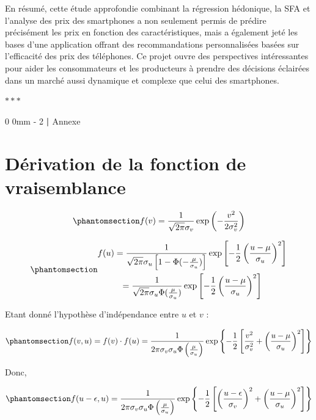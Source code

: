 \documentclass[
  12pt,
]{report}
\makeatletter
\newcommand{\macrostars}{
    \vspace{2em}
    \begin{center}
        \textcolor{highlight!80!black}{\Large{$\ast\ast\ast$}}
    \end{center}
}
\renewcommand{\chapter}{%
    \clearpage %
    \@startsection{chapter}%
    {0} %
    {0mm} %
    {-\baselineskip} %
    {2\baselineskip} %
    {\normalfont\Huge\bfseries | \Huge\bfseries}%
}
\makeatother
\begin{document}
En résumé, cette étude approfondie combinant la régression hédonique, la
SFA et l'analyse des prix des smartphones a non seulement permis de
prédire précisément les prix en fonction des caractéristiques, mais a
également jeté les bases d'une application offrant des recommandations
personnalisées basées sur l'efficacité des prix des téléphones. Ce
projet ouvre des perspectives intéressantes pour aider les consommateurs
et les producteurs à prendre des décisions éclairées dans un marché
aussi dynamique et complexe que celui des smartphones.

\macrostars

\chapter{Annexe}\label{annexe}

\section{Dérivation de la fonction de
vraisemblance}\label{duxe9rivation-de-la-fonction-de-vraisemblance}

\begin{equation}\phantomsection\label{eq-fv}{
f(v) = \frac{1}{\sqrt{2\pi}\sigma_v}\exp{\left(-\frac{v^2}{2\sigma^2_v} \right)}
}\end{equation}

\begin{equation}\phantomsection\label{eq-fu}{
\begin{gathered}
f(u) = \frac{1}{\sqrt{2\pi}\sigma_u\left[1-\Phi(-\frac{\mu}{\sigma_u})\right]}\exp\left[-\frac{1}{2}\left(\frac{u-\mu}{\sigma_u}\right)^2 \right]\\
= \frac{1}{\sqrt{2\pi}\sigma_u\Phi(\frac{\mu}{\sigma_u})}\exp\left[-\frac{1}{2}\left(\frac{u-\mu}{\sigma_u}\right)^2 \right]
\end{gathered}
}\end{equation}

Etant donné l'hypothèse d'indépendance entre \(u\) et \(v\) :

\begin{equation}\phantomsection\label{eq-fv-fu}{
f(v,u) = f(v) \cdot f(u) = \frac{1}{2\pi\sigma_v\sigma_u\Phi\left(\frac{\mu}{\sigma_u}\right)}\exp\left\{-\frac{1}{2}\left[\frac{v^2}{\sigma^2_v} + \left(\frac{u-\mu}{\sigma_u}\right)^2\right] \right\}
}\end{equation}

Donc,

\begin{equation}\phantomsection\label{eq-fepsilon}{
f(u-\epsilon, u) = \frac{1}{2\pi\sigma_v\sigma_u\Phi\left(\frac{\mu}{\sigma_u}\right)}\exp\left\{-\frac{1}{2}\left[\left(\frac{u-\epsilon}{\sigma_v}\right)^2 + \left(\frac{u-\mu}{\sigma_u}\right)^2\right] \right\}
}\end{equation}
\end{document}
